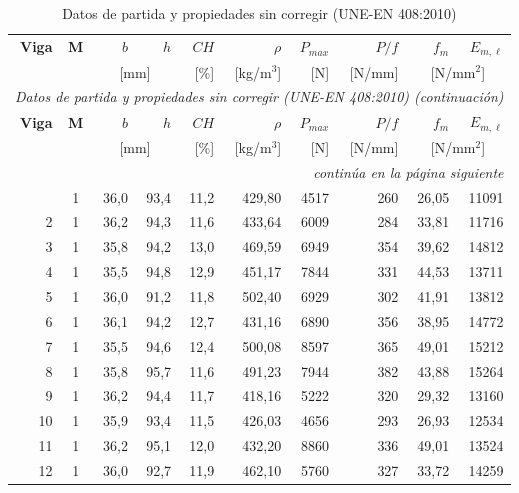 \documentclass[11pt,a4paper]{article}
\newcommand{\fm}{f_{m}}
\newcommand{\Eml}{E_{m,\ell}}
\begin{document}
{\footnotesize
\begin{longtable}{r c r r r r r r r r}
\caption[Datos de partida y propiedades sin corregir (UNE-EN 408:2010)]{Datos de partida y propiedades sin corregir (UNE-EN 408:2010)}\label{tab:anexoB1}\\
\toprule
\textbf{Viga} & \textbf{M} & \textbf{$b$} & \textbf{$h$} & \textbf{$CH$} & \textbf{$\rho$} & \textbf{$P_{max}$} & \textbf{$P/f$} & \textbf{$\fm$} & \textbf{$\Eml$} \\
 & & \multicolumn{2}{c}{[mm]} & [\%] & [kg/m$^{3}$] & [N] & [N/mm] & \multicolumn{2}{c}{[N/mm$^{2}$]} \\
\midrule
\endfirsthead
\multicolumn{10}{l}{\footnotesize\itshape Datos de partida y propiedades sin corregir (UNE-EN 408:2010) (continuación)}\\
\toprule
\textbf{Viga} & \textbf{M} & \textbf{$b$} & \textbf{$h$} & \textbf{$CH$} & \textbf{$\rho$} & \textbf{$P_{max}$} & \textbf{$P/f$} & \textbf{$\fm$} & \textbf{$\Eml$} \\
 & & \multicolumn{2}{c}{[mm]} & [\%] & [kg/m$^{3}$] & [N] & [N/mm] & \multicolumn{2}{c}{[N/mm$^{2}$]} \\
\midrule
\endhead
\midrule \multicolumn{10}{r}{\footnotesize\itshape continúa en la página siguiente}\\
\endfoot
\bottomrule
\endlastfoot
1 & 1 & 36,0 & 93,4 & 11,2 & 429,80 & 4517 & 260 & 26,05 & 11091 \\
2 & 1 & 36,2 & 94,3 & 11,6 & 433,64 & 6009 & 284 & 33,81 & 11716 \\
3 & 1 & 35,8 & 94,2 & 13,0 & 469,59 & 6949 & 354 & 39,62 & 14812 \\
4 & 1 & 35,5 & 94,8 & 12,9 & 451,17 & 7844 & 331 & 44,53 & 13711 \\
5 & 1 & 36,0 & 91,2 & 11,8 & 502,40 & 6929 & 302 & 41,91 & 13812 \\
6 & 1 & 36,1 & 94,2 & 12,7 & 431,16 & 6890 & 356 & 38,95 & 14772 \\
7 & 1 & 35,5 & 94,6 & 12,4 & 500,08 & 8597 & 365 & 49,01 & 15212 \\
8 & 1 & 35,8 & 95,7 & 11,6 & 491,23 & 7944 & 382 & 43,88 & 15264 \\
9 & 1 & 36,2 & 94,4 & 11,7 & 418,16 & 5222 & 320 & 29,32 & 13160 \\
10 & 1 & 35,9 & 93,4 & 11,5 & 426,03 & 4656 & 293 & 26,93 & 12534 \\
11 & 1 & 36,2 & 95,1 & 12,0 & 432,20 & 8860 & 336 & 49,01 & 13524 \\
12 & 1 & 36,0 & 92,7 & 11,9 & 462,10 & 5760 & 327 & 33,72 & 14259 \\

\end{longtable}}
\end{document}
